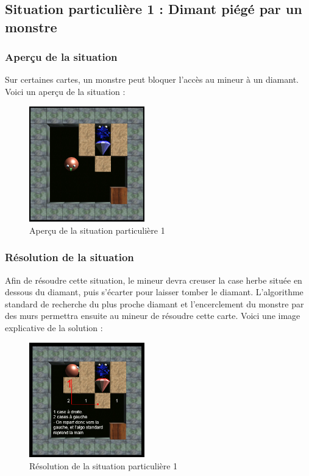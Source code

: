 \documentclass[a4paper,11pt]{article}
\begin{document}
	\newpage
	\subsection{Situation particulière 1 : Dimant piégé par un monstre}
	
		\subsubsection{Aperçu de la situation}
		
		Sur certaines cartes, un monstre peut bloquer l’accès au mineur à un diamant. Voici un aperçu de la situation :
		
		\begin{figure}[h]
			\center
			\includegraphics[width=5cm]{situation12}
			\caption{\label{situation1} Aperçu de la situation particulière 1 }
		\end{figure}
			
		\subsubsection{Résolution de la situation}
		
Afin de résoudre cette situation, le mineur devra creuser la case herbe située en dessous du diamant, puis s’écarter pour laisser tomber le diamant. L’algorithme standard de recherche du plus proche diamant et l’encerclement du monstre par des murs permettra ensuite au mineur de résoudre cette carte. Voici une image explicative de la solution :

		\begin{figure}[h]
			\center
			\includegraphics[width=5cm]{situation111}
			\caption{\label{situation1reso} Résolution de la situation particulière 1 }
		\end{figure}
	
\end{document}
